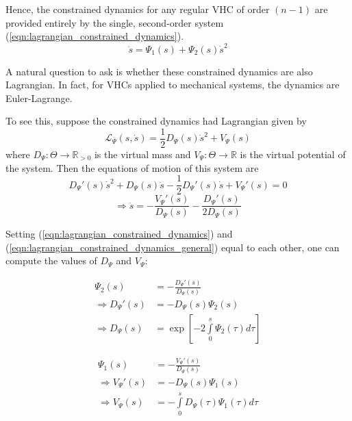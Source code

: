 Hence, the constrained dynamics for any regular VHC of order \((n-1)\) are
provided entirely by the single, second-order system 
(\ref{eqn:lagrangian_constrained_dynamics}).
\begin{equation}\label{eqn:lagrangian_constrained_dynamics}
   \ddot{s} = \Psi_1(s) + \Psi_2(s)\dot{s}^2
\end{equation}

A natural question to ask is whether these constrained dynamics are also
Lagrangian. In fact, for VHCs applied to mechanical systems, the dynamics are
Euler-Lagrange. \cite{lagrangian_structure_reduced_dynamics_vhcs}

To see this, suppose the constrained dynamics had Lagrangian given by
\begin{equation}\label{eqn:vhcs_constrained_lagrangian}
   \mathcal{L}_{\Psi}(s,\dot{s}) = \frac{1}{2}
   D_{\Psi}(s)\dot{s}^2 + V_{\Psi}(s)
\end{equation}
where \(D_{\Psi} : \Theta \rightarrow \mathbb{R}_{>0}\) is the virtual mass
and \(V_{\Psi} : \Theta \rightarrow \mathbb{R}\) is the virtual potential of the
system. Then the equations of motion of this system are
\begin{equation*}
   D_{\Psi}'(s)\dot{s}^2 + D_{\Psi}(s)\ddot{s} - \frac{1}{2}D_{\Psi}'(s)\dot{s}
   + V_{\Psi}'(s) = 0
\end{equation*}
\begin{equation}\label{eqn:lagrangian_constrained_dynamics_general}
   \Rightarrow \ddot{s} = -\frac{V_{\Psi}'(s)}{D_{\Psi}(s)} -
   \frac{D_{\Psi}'(s)}{2 D_{\Psi}(s)}
\end{equation}

Setting (\ref{eqn:lagrangian_constrained_dynamics}) and
(\ref{eqn:lagrangian_constrained_dynamics_general}) equal to each other, one
can compute the values of \(D_{\Psi}\) and \(V_{\Psi}\): 

\begin{minipage}{0.48\textwidth}
\begin{align*}
   \Psi_2(s) &= -\frac{D_{\Psi}'(s)}{D_\Psi(s)} \\
   \Rightarrow D_{\Psi}'(s) &= -D_{\Psi}(s) \Psi_2(s) \\
   \Rightarrow D_{\Psi}(s) &= \exp\left[ 
   -2\int \limits_{0}^s \Psi_2(\tau) d\tau \right]
\end{align*}
\end{minipage}
\begin{minipage}{0.48\textwidth}
\begin{align*}
   \Psi_1(s) &= -\frac{V_{\Psi}'(s)}{D_{\Psi}(s)} \\
   \Rightarrow V_{\Psi}'(s) &= -D_{\Psi}(s) \Psi_1(s) \\
   \Rightarrow V_{\Psi}(s) &= - \int \limits_{0}^s
   D_{\Psi}(\tau)\Psi_1(\tau)d\tau
\end{align*}
\end{minipage}


